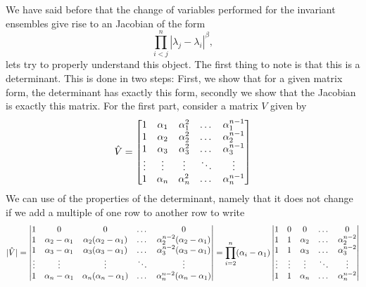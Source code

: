 We have said before that the change of variables performed for the invariant ensembles give rise to an Jacobian of the form
\[
	\prod_{i<j}^n |\lambda_j - \lambda_i|^\beta,
\]
lets try to properly understand this object. The first thing to note is that this is a determinant. This is done in two steps: First, we show that for a given matrix form, the determinant has exactly this form, secondly we show that the Jacobian is exactly this matrix. For the first part, consider a matrix $V$ given by 
\[
\hat V = 
\begin{bmatrix}
	1 & \alpha_1 & \alpha_1^2 & \dots & \alpha_1^{n-1} \\
	1 & \alpha_2 & \alpha_2^2 & \dots & \alpha_2^{n-1} \\
	1 & \alpha_3 & \alpha_3^2 & \dots & \alpha_3^{n-1} \\
	\vdots & \vdots & \vdots & \ddots & \vdots \\
	1 & \alpha_n & \alpha_n^2 & \dots & \alpha_n^{n-1}
\end{bmatrix}
\]
We can use of the properties of the determinant, namely that it does not change if we add a multiple of one row to another row to write
\[
|\hat V|=
\begin{vmatrix}
	1 & 0 & 0 & \dots & 0 \\
	1 & \alpha_2 - \alpha_1 & \alpha_2(\alpha_2 - \alpha_1) & \dots & \alpha_2^{n-2}(\alpha_2 - \alpha_1) \\
	1 & \alpha_3 - \alpha_1& \alpha_3(\alpha_3 - \alpha_1) & \dots & \alpha_3^{n-2} (\alpha_3 - \alpha_1)\\
	\vdots & \vdots & \vdots & \ddots & \vdots \\
	1 & \alpha_n- \alpha_1 & \alpha_n(\alpha_n - \alpha_1) & \dots & \alpha_n^{n-2}(\alpha_n - \alpha_1)
\end{vmatrix}
= \prod_{i=2}^n (\alpha_i - \alpha_1)
\begin{vmatrix}
	1 & 0 & 0 & \dots & 0 \\
	1 & 1 & \alpha_2 & \dots & \alpha_2^{n-2} \\
	1 & 1 & \alpha_3 & \dots & \alpha_3^{n-2} \\
	\vdots & \vdots & \vdots & \ddots & \vdots \\
	1 & 1 & \alpha_n & \dots & \alpha_n^{n-2}
\end{vmatrix}
\]
